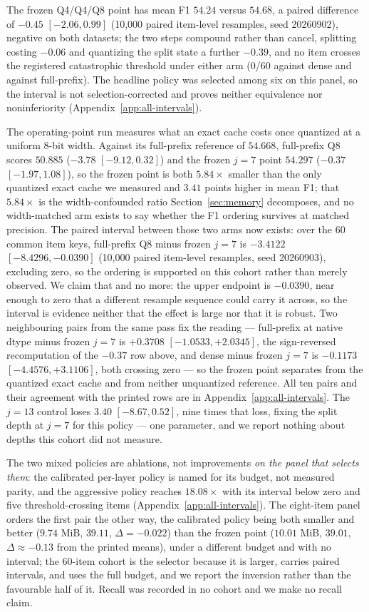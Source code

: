 \documentclass{article}
\begin{document}
The frozen Q4/Q4/Q8 point has mean F1 $54.24$ versus $54.68$, a paired
difference of $-0.45$ $[-2.06,0.99]$ (10,000 paired item-level resamples, seed
20260902), negative on both datasets; the two steps compound rather than cancel,
splitting costing $-0.06$ and quantizing the split state a further $-0.39$, and
no item crosses the registered catastrophic threshold under either arm (0/60
against dense and against full-prefix).  The headline policy was selected among
six on this panel, so the interval is not selection-corrected and proves neither
equivalence nor noninferiority (Appendix~\ref{app:all-intervals}).

The operating-point run measures what an exact cache costs once quantized at a
uniform 8-bit width.  Against its full-prefix reference of $54.668$, full-prefix
Q8 scores $50.885$ ($-3.78$ $[-9.12,0.32]$) and the frozen $j=7$ point $54.297$
($-0.37$ $[-1.97,1.08]$), so the frozen point is both $5.84\times$ smaller than
the only quantized exact cache we measured and $3.41$ points higher in mean F1; that $5.84\times$ is the width-confounded ratio
Section~\ref{sec:memory} decomposes, and no width-matched arm exists to say
whether the F1 ordering survives at matched precision.  The paired interval
between those two arms now exists: over the 60 common item keys, full-prefix Q8
minus frozen $j=7$ is $-3.4122$ $[-8.4296,-0.0390]$ (10,000 paired item-level
resamples, seed 20260903), excluding zero, so the ordering is supported on this
cohort rather than merely observed.  We claim that and no more: the upper
endpoint is $-0.0390$, near enough to zero that a different resample sequence
could carry it across, so the interval is evidence neither that the effect is
large nor that it is robust.  Two neighbouring pairs from the same pass fix the
reading --- full-prefix at native dtype minus frozen $j=7$ is $+0.3708$
$[-1.0533,+2.0345]$, the sign-reversed recomputation of the $-0.37$ row above,
and dense minus frozen $j=7$ is $-0.1173$ $[-4.4576,+3.1106]$, both crossing
zero --- so the frozen point separates from the quantized exact cache and from
neither unquantized reference.  All ten pairs and their agreement with the
printed rows are in Appendix~\ref{app:all-intervals}.  The
$j=13$ control loses
$3.40$ $[-8.67,0.52]$, nine times that loss, fixing the split depth at $j=7$ for
this policy --- one parameter, and we report nothing about depths this cohort did
not measure.

The two mixed policies are ablations, not improvements \emph{on the panel that
selects them}: the calibrated per-layer policy is named for its budget, not
measured parity, and the aggressive policy reaches $18.08\times$ with its
interval below zero and five threshold-crossing items
(Appendix~\ref{app:all-intervals}).  The eight-item panel orders the first pair
the other way, the calibrated policy being both smaller and better ($9.74$ MiB,
$39.11$, $\Delta=-0.022$) than the frozen point ($10.01$ MiB, $39.01$,
$\Delta\approx-0.13$ from the printed means), under a different budget and with no
interval; the 60-item cohort is the selector because it is larger, carries paired
intervals, and uses the full budget, and we report the inversion rather than the
favourable half of it.  Recall was recorded in no cohort and we make no recall
claim.
\end{document}
